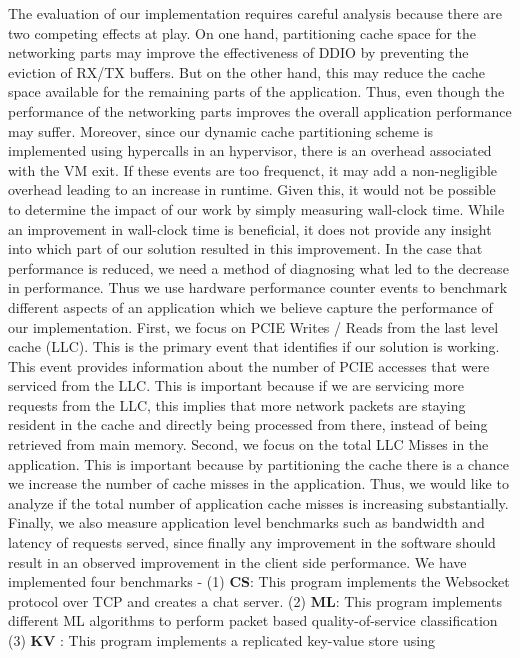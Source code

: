 \documentclass[sigconf,authorversion,noacm]{acmart}
\begin{document}
The evaluation of our implementation requires careful analysis because there are
two competing effects at play. On one hand, partitioning cache space for the
networking parts may improve the effectiveness of DDIO by preventing the
eviction of RX/TX buffers. But on the other hand, this may reduce the cache
space available for the remaining parts of the application. Thus, even though
the performance of the networking parts improves the overall application
performance may suffer. Moreover, since our dynamic cache partitioning scheme is
implemented using hypercalls in an hypervisor, there is an overhead associated
with the VM exit. If these events are too frequenct, it may add a
non-negligible overhead leading to an increase in runtime. Given this, it would
not be possible to determine the impact of our work by simply measuring
wall-clock time. While an improvement in wall-clock time is beneficial, it does
not provide any insight into which part of our solution resulted in this
improvement. In the case that performance is reduced, we need a method of
diagnosing what led to the decrease in performance. Thus we use hardware
performance counter events to benchmark different aspects of an application
which we believe capture the performance of our implementation. First, we focus
on PCIE Writes / Reads from the last level cache (LLC). This is the primary
event that identifies if our solution is working. This event provides
information about the number of PCIE accesses that were serviced from the LLC.
This is important because if we are servicing more requests from the LLC, this
implies that more network packets are staying resident in the cache and directly
being processed from there, instead of being retrieved from main memory. Second,
we focus on the total LLC Misses in the application. This is important because
by partitioning the cache there is a chance we increase the number of cache
misses in the application. Thus, we would like to analyze if the total number of
application cache misses is increasing substantially. Finally, we also measure
application level benchmarks such as bandwidth and latency of requests served,
since finally any improvement in the software should result in an observed
improvement in the client side performance. We have implemented four benchmarks
- (1) \textbf{CS}: This program implements the Websocket protocol over TCP and
creates a chat server. (2) \textbf{ML}: This program implements different ML
algorithms to perform packet based quality-of-service classification (3)
\textbf{KV} : This program implements a replicated key-value store using
\end{document}
